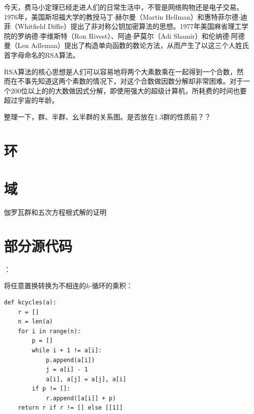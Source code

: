 \documentclass{article}
\begin{document}
今天，费马小定理已经走进人们的日常生活中，不管是网络购物还是电子交易。1976年，美国斯坦福大学的教授马丁$\cdot$赫尔曼（Martin Hellman）和惠特菲尔德$\cdot$迪菲（Whitfield Diffie）提出了非对称公钥加密算法的思想。1977年美国麻省理工学院的罗纳德$\cdot$李维斯特（Ron Rivest）、阿迪$\cdot$萨莫尔（Adi Shamir）和伦纳德$\cdot$阿德曼（Len Adleman）提出了构造单向函数的数论方法，从而产生了以这三个人姓氏首字母命名的RSA算法。

RSA算法的核心思想是人们可以容易地将两个大素数乘在一起得到一个合数，然而在不事先知道这两个素数的情况下，对这个合数做因数分解却非常困难。对于一个200位以上的的大数做因式分解，即使用强大的超级计算机，所耗费的时间也要超过宇宙的年龄。


整理一下，群、半群、幺半群的关系图。是否放在1.3群的性质前？？

\begin{Exercise}
\end{Exercise}
\section{环}

\section{域}

伽罗瓦群和五次方程根式解的证明

\section{部分源代码}：

将任意置换转换为不相连的$k$-循环的乘积：
\lstset{language=Python}
\begin{lstlisting}
def kcycles(a):
    r = []
    n = len(a)
    for i in range(n):
        p = []
        while i + 1 != a[i]:
            p.append(a[i])
            j = a[i] - 1
            a[i], a[j] = a[j], a[i]
        if p != []:
            r.append([a[i]] + p)
    return r if r != [] else [[1]]
\end{lstlisting}
\end{document}

